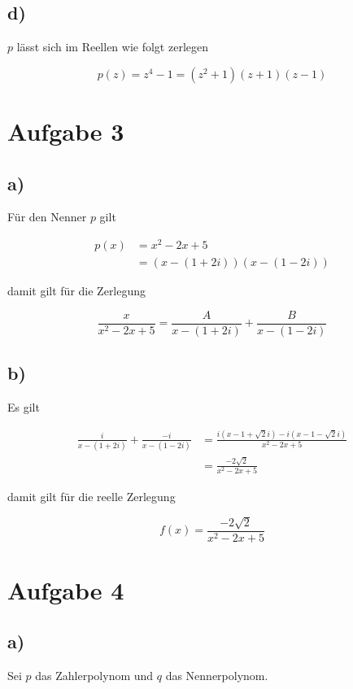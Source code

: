 \documentclass[a4paper, 11pt]{article}
\begin{document}
\subsection{d)}
\label{sec:org0c498dc}
\(p\) lässt sich im Reellen wie folgt zerlegen

$$ p(z) = z^4 - 1 = (z^2 + 1)(z + 1)(z - 1) $$

\pagebreak

\section{Aufgabe 3}
\label{sec:orgb3171c6}
\subsection{a)}
\label{sec:orgfe2dec5}
Für den Nenner \(p\) gilt

\begin{align*}
    p(x) &= x^2 - 2x + 5 \\
    &= (x - (1 + 2i))(x - (1 - 2i))
\end{align*}

damit gilt für die Zerlegung

$$ \frac{x}{x^2 - 2x + 5} = \frac{A}{x - (1 + 2i)} + \frac{B}{x - (1 - 2i)} $$

\subsection{b)}
\label{sec:org5016542}
Es gilt

\begin{align*}
    \frac{i}{x - (1 + 2i)} + \frac{-i}{x - (1 - 2i)} &=
       \frac{i(x - 1 + \sqrt{2}i) - i(x - 1 - \sqrt{2}i)}{x^2 - 2x + 5} \\
    &= \frac{-2\sqrt{2}}{x^2 - 2x + 5}
\end{align*}

damit gilt für die reelle Zerlegung

$$ f(x) = \frac{-2\sqrt{2}}{x^2 - 2x + 5} $$

\section{Aufgabe 4}
\label{sec:orga5bb5d6}
\subsection{a)}
\label{sec:org13b630f}
Sei \(p\) das Zahlerpolynom und \(q\) das Nennerpolynom.
\end{document}
